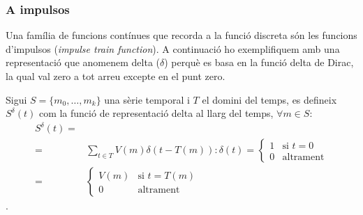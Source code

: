 \subsubsection{A impulsos}

Una família de funcions contínues que recorda a la funció discreta són
les funcions d'impulsos (\emph{impulse train function}).  A
continuació ho exemplifiquem amb una representació que anomenem delta
($\delta$) perquè es basa en la funció delta de Dirac, la qual val
zero a tot arreu excepte en el punt zero.

\begin{definition}
  Sigui $S=\{m_0,\ldots,m_k\}$ una sèrie temporal i $T$ el domini del
  temps, es defineix $S^\delta(t)$ com la funció de representació
  delta al llarg del temps, $\forall m \in S:$
  \begin{align*}
    S^\delta(t) = &  \\
    = & \sum_{t\in T} V(m) \delta(t-T(m)): \delta(t)= 
      \begin{cases}
        1 & \text{si }  t=0 \\
        0 & \text{altrament}
      \end{cases} \\
    = & \begin{cases}
      V(m) & \text{si }  t=T(m) \\
      0 & \text{altrament}
    \end{cases}
         \end{align*}.
\end{definition}



